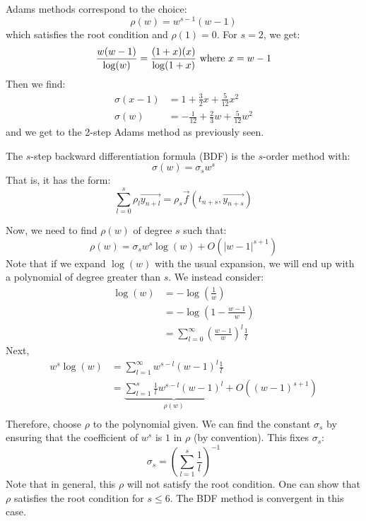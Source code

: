 \documentclass[../Main.tex]{subfiles}
\begin{document}
\begin{example}
    Adams methods correspond to the choice:
    \begin{equation*}
        \rho(w) = w^{s-1}(w-1)
    \end{equation*}
    which satisfies the root condition and $\rho(1) = 0$. For $s = 2$, we get:
    \begin{equation*}
        \frac{w(w-1)}{\log(w)} = \frac{(1 + x)(x)}{\log(1+x)} \text{ where $x = w - 1$} \\
    \end{equation*}
    Then we find:
    \begin{align*}
        \sigma(x - 1) &= 1 + \frac32 x + \frac5{12} x^2 \\
        \sigma(w) &= -\frac{1}{12} + \frac23 w + \frac{5}{12} w^2
    \end{align*}
    and we get to the 2-step Adams method as previously seen.
\end{example}
\begin{example}
    The $s$-step backward differentiation formula (BDF) is the $s$-order method with:
    \begin{equation*}
        \sigma(w) = \sigma_s w^s
    \end{equation*}
    That is, it has the form:
    \begin{equation*}
        \sum_{l=0}^{s} \rho_l \vec{y_{n + l}} = \rho_s \vec{f}(t_{n+s}, \vec{y_{n+s}})
    \end{equation*}

    Now, we need to find $\rho(w)$ of degree $s$ such that:
    \begin{equation*}
        \rho(w) = \sigma_s w^s \log(w) + O(|w - 1|^{s+1})
    \end{equation*}
    Note that if we expand $\log(w)$ with the usual expansion, we will end up with a polynomial of degree greater than $s$. We instead consider:
    \begin{align*}
        \log(w) &= - \log\left(\frac{1}{w}\right) \\
        &= -\log\left(1 - \frac{w-1}{w}\right) \\
        &= \sum_{l=0}^{\infty} \left(\frac{w - 1}{w}\right)^l \frac1l
    \end{align*}
    Next,
    \begin{align*}
        w^s \log(w) &= \sum_{l=1}^{\infty} w^{s-l} (w-1)^l \frac1l \\
        &= \underbrace{\sum_{l=1}^{s} \frac1l w^{s-l} (w-1)^l}_{\rho(w)} + O\left((w-1)^{s+1}\right) \\
    \end{align*}
    Therefore, choose $\rho$ to the polynomial given. We can find the constant $\sigma_s$ by ensuring that the coefficient of $w^s$ is $1$ in $\rho$ (by convention). This fixes $\sigma_s$:
    \begin{equation*}
        \sigma_s = \left(\sum_{l=1}^{s} \frac1l\right)^{-1}
    \end{equation*}
    Note that in general, this $\rho$ will not satisfy the root condition. One can show that $\rho$ satisfies the root condition for $s \leq 6$. The BDF method is convergent in this case.
\end{example}
\end{document}
